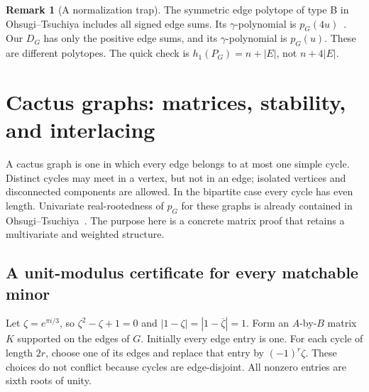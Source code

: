 \documentclass[11pt]{article}
\numberwithin{equation}{section}
\theoremstyle{definition}
\newtheorem{remark}[theorem]{Remark}
\begin{document}
\begin{remark}[A normalization trap]
The symmetric edge polytope of type B in Ohsugi--Tsuchiya includes all
signed edge sums. Its $\gamma$-polynomial is $p_G(4u)$~\cite{OT20,OT21}.
Our $D_G$ has only the positive edge sums, and its $\gamma$-polynomial is
$p_G(u)$. These are different polytopes. The quick check is
$h_1(P_G)=n+|E|$, not $n+4|E|$.
\end{remark}

\section{Cactus graphs: matrices, stability, and interlacing}\label{htwo:sec:cactus}

A cactus graph is one in which every edge belongs to at most one simple
cycle. Distinct cycles may meet in a vertex, but not in an edge; isolated
vertices and disconnected components are allowed. In the bipartite case
every cycle has even length. Univariate real-rootedness of $p_G$ for these
graphs is already contained in Ohsugi--Tsuchiya~\cite[Theorem~7.2]{OT21}.
The purpose here is a concrete matrix proof that retains a multivariate
and weighted structure.

\subsection{A unit-modulus certificate for every matchable minor}

Let $\zeta=e^{\pi i/3}$, so $\zeta^2-\zeta+1=0$ and
$|1-\zeta|=|1-\overline\zeta|=1$. Form an $A$-by-$B$ matrix $K$ supported
on the edges of $G$. Initially every edge entry is one. For each cycle of
length $2r$, choose one of its edges and replace that entry by
$(-1)^r\zeta$. These choices do not conflict because cycles are
edge-disjoint. All nonzero entries are sixth roots of unity.
\end{document}
